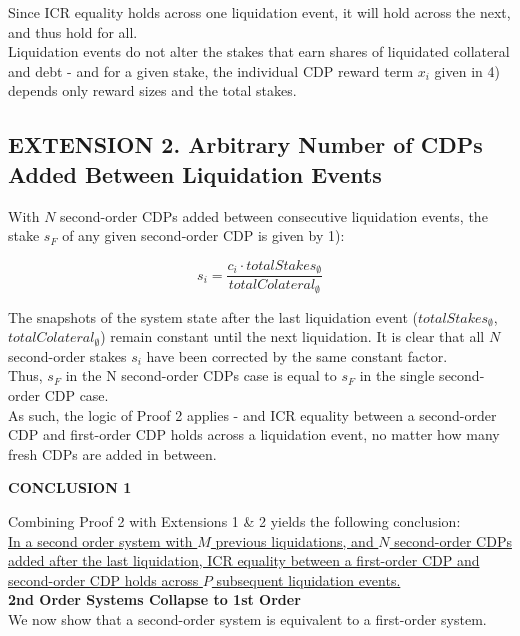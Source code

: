 \documentclass[reqno]{article}
\begin{document}
Since ICR equality holds across one liquidation event, it will hold across the next, and thus hold for all.\\

Liquidation events do not alter the stakes that earn shares of liquidated collateral and debt - and for a given stake, the individual CDP reward term $x_i$ given in 4) depends only reward sizes and the total stakes.

\bigskip
\subsection*{EXTENSION 2. Arbitrary Number of CDPs Added Between Liquidation Events}

With $N$ second-order CDPs added between consecutive liquidation events, the stake $s_F$ of any given second-order CDP is given by 1): 

\begin{equation} 
    s_i=\frac{c_i \cdot totalStakes_\emptyset}{totalColateral_\emptyset}
\end{equation}

\bigskip
The snapshots of the system state after the last liquidation event ($totalStakes_\emptyset$, $totalColateral_\emptyset$) remain constant until the next liquidation. It is clear that all $N$ second-order stakes $s_i$ have been corrected by the same constant factor.\\

Thus, $s_F$ in the N second-order CDPs case is equal to $s_F$ in the single second-order CDP case.\\

As such, the logic of Proof 2 applies - and ICR equality between a second-order CDP and first-order CDP holds across a liquidation event, no matter how many fresh CDPs are added in between.

\bigskip
\textbf{CONCLUSION 1}

\bigskip
Combining Proof 2 with Extensions 1 \& 2 yields the following conclusion:\\

\uline{In a second order system with $M$ previous liquidations, and $N$ second-order CDPs added after the last liquidation, ICR equality between a first-order CDP and second-order CDP holds across $P$ subsequent liquidation events.}\\

\textbf{2nd Order Systems Collapse to 1st Order}\\
We now show that a second-order system is equivalent to a first-order system.\\
\end{document}
